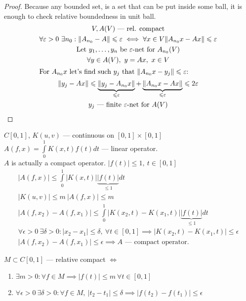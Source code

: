 \begin{proof}
  Because any bounded set, is a set that can be put inside some ball, it is
  enough to check relative boundedness in unit ball.
  \begin{gather*}
    V, A(V) \text{ --- rel. compact} \\
    \forall \epsilon > 0\ \exists n_0 : \|A_{n_0} - A\| \leq \epsilon \iff \forall x \in V \|A_{n_0} x - Ax\| \leq \epsilon \\
    \text{Let } y_1, \dotsc, y_n \text{ be $\epsilon$-net for } A_{n_0}(V) \\
    \forall y \in A(V),\ y = Ax,\ x \in V \\
    \shortintertext{For $A_{n_0} x$ let's find such $y_j$ that $\|A_{n_0} x - y_j\| \leq \epsilon$:}
    \|y_j - Ax\| \leq \underbrace{\|y_j - A_{n_0} x \|}_{\leq \epsilon} + \underbrace{\|A_{n_0} x -
      Ax\|}_{\leq \epsilon} \leq 2 \epsilon \\
    y_j \text{ --- finite $\epsilon$-net for $A(V)$} \qedhere
  \end{gather*}
\end{proof}

\begin{ex}
  $C[0, 1]$, $K(u, v)$ --- continuous on $[0, 1] \times [0, 1]$ \\
  $A(f, x) = \int\limits_0^1 K(x, t)f(t) dt$ --- linear operator. \\
  $A$ is actually a compact operator. $|f(t)| \leq 1,\ t \in [0, 1]$ 
  \begin{gather*}
    |A(f, x)| \leq \int\limits_0^1 |K(x, t)| \underbrace{|f(t)|}_{\leq 1} dt \\
    |K(u, v)| \leq m\ |A(f, x)| \leq m \\
    |A(f, x_2) - A(f, x_1)| \leq \int\limits_0^1 |K(x_2, t) - K(x_1, t)| \underbrace{|f(t)|}_{\leq 1} dt \\
    \forall \epsilon > 0\ \exists \delta > 0 : |x_2 - x_1| \leq \delta,\ \forall t \in [0, 1] \implies |K(x_2, t) - K(x_1, t)| \leq \epsilon \\
    |A(f, x_2) - A(f, x_1)| \leq \epsilon \implies A \text{ --- compact operator.}
  \end{gather*}
\end{ex}

\begin{thm}
  $M \subset C[0, 1]$ --- relative compact $\iff$
  \begin{enumerate}
  \item $\exists m > 0 : \forall f \in M \implies  |f(t)| \leq m\ \forall t
    \in [0, 1]$
  \item $\forall \epsilon > 0\ \exists \delta > 0 : \forall f \in M,\ |t_2 -
    t_1| \leq \delta \implies |f(t_2) - f(t_1)| \leq \epsilon$
  \end{enumerate}
\end{thm}

